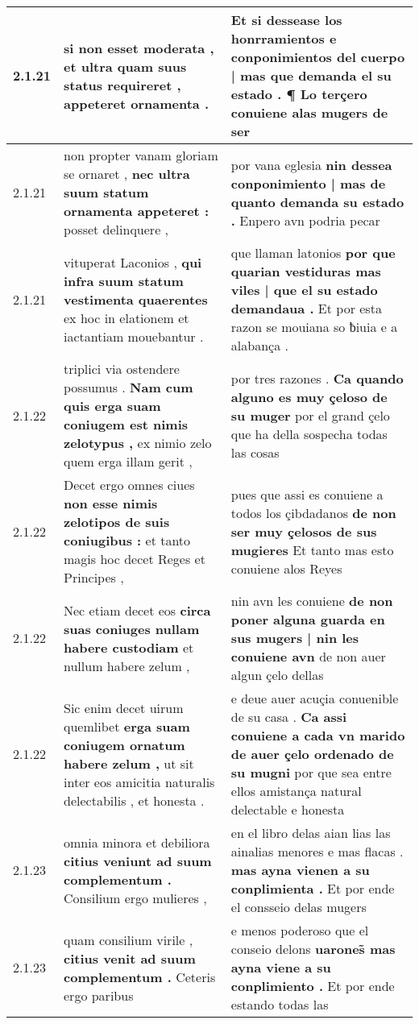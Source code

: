 \begin{tabular}{|p{1cm}|p{6.5cm}|p{6.5cm}|}
2.1.21 & si non esset moderata , \textbf{ et ultra quam suus status requireret , } appeteret ornamenta . & Et si \textbf{ dessease los honrramientos e conponimientos del cuerpo | mas que demanda el su estado . } ¶ Lo terçero conuiene alas mugers de ser \\\hline
2.1.21 & non propter vanam gloriam se ornaret , \textbf{ nec ultra suum statum ornamenta appeteret : } posset delinquere , & por vana eglesia \textbf{ nin dessea conponimiento | mas de quanto demanda su estado . } Enpero avn podria pecar \\\hline
2.1.21 & vituperat Laconios , \textbf{ qui infra suum statum vestimenta quaerentes } ex hoc in elationem et iactantiam mouebantur . & que llaman latonios \textbf{ por que quarian vestiduras mas viles | que el su estado demandaua . } Et por esta razon se mouiana so ƀiuia e a alabança . \\\hline
2.1.22 & triplici via ostendere possumus . \textbf{ Nam cum quis erga suam coniugem est nimis zelotypus , } ex nimio zelo quem erga illam gerit , & por tres razones . \textbf{ Ca quando alguno es muy çeloso de su muger } por el grand çelo que ha della sospecha todas las cosas \\\hline
2.1.22 & Decet ergo omnes ciues \textbf{ non esse nimis zelotipos de suis coniugibus : } et tanto magis hoc decet Reges et Principes , & pues que assi es conuiene a todos los çibdadanos \textbf{ de non ser muy çelosos de sus mugieres } Et tanto mas esto conuiene alos Reyes \\\hline
2.1.22 & Nec etiam decet eos \textbf{ circa suas coniuges nullam habere custodiam } et nullum habere zelum , & nin avn les conuiene \textbf{ de non poner alguna guarda en sus mugers | nin les conuiene avn } de non auer algun çelo dellas \\\hline
2.1.22 & Sic enim decet uirum quemlibet \textbf{ erga suam coniugem ornatum habere zelum , } ut sit inter eos amicitia naturalis delectabilis , et honesta . & e deue auer acuçia conuenible de su casa . \textbf{ Ca assi conuiene a cada vn marido de auer çelo ordenado de su mugni } por que sea entre ellos amistança natural delectable e honesta \\\hline
2.1.23 & omnia minora et debiliora \textbf{ citius veniunt ad suum complementum . } Consilium ergo mulieres , & en el libro delas aian lias las ainalias menores e mas flacas . \textbf{ mas ayna vienen a su conplimienta . } Et por ende el consseio delas mugers \\\hline
2.1.23 & quam consilium virile , \textbf{ citius venit ad suum complementum . } Ceteris ergo paribus & e menos poderoso que el conseio delons \textbf{ uarones̃ mas ayna viene a su conplimiento . } Et por ende estando todas las \\\hline

\end{tabular}

